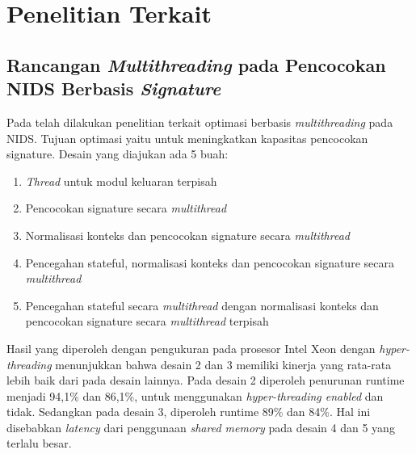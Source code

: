 \section{Penelitian Terkait}

  \subsection{Rancangan \emph{Multithreading} pada Pencocokan NIDS Berbasis \emph{Signature}} 

    Pada \parencite{multi2004} telah dilakukan penelitian terkait optimasi berbasis \emph{multithreading} pada NIDS. Tujuan optimasi yaitu untuk meningkatkan kapasitas pencocokan signature. Desain yang diajukan ada 5 buah:

    \begin{enumerate}
      \item \emph{Thread} untuk modul keluaran terpisah
      \item Pencocokan signature secara \emph{multithread}
      \item Normalisasi konteks dan pencocokan signature secara \emph{multithread}
      \item Pencegahan stateful, normalisasi konteks dan pencocokan signature secara \emph{multithread}
      \item Pencegahan stateful secara \emph{multithread} dengan normalisasi konteks dan pencocokan signature secara \emph{multithread} terpisah
    \end{enumerate}

    Hasil yang diperoleh dengan pengukuran pada prosesor Intel Xeon dengan \emph{hyper-threading} menunjukkan bahwa desain 2 dan 3 memiliki kinerja yang rata-rata lebih baik dari pada desain lainnya. Pada desain 2 diperoleh penurunan runtime menjadi 94,1\% dan 86,1\%, untuk menggunakan \emph{hyper-threading enabled} dan tidak. Sedangkan pada desain 3, diperoleh runtime 89\% dan 84\%. Hal ini disebabkan \emph{latency} dari penggunaan \emph{shared memory} pada desain 4 dan 5 yang terlalu besar.


